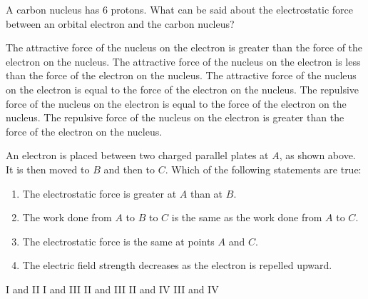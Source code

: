 \documentclass{../../ossphysics}
\begin{document}
\begin{questions}
  \question A carbon nucleus has 6 protons. What can be said about the
  electrostatic force between an orbital electron and the carbon nucleus?
  \begin{choices}
    \choice The attractive force of the nucleus on the electron is greater than
    the force of the electron on the nucleus.
    \choice The attractive force of the nucleus on the electron is less than the
    force of the electron on the nucleus.
    \choice The attractive force of the nucleus on the electron is equal to the
    force of the electron on the nucleus.
    \choice The repulsive force of the nucleus on the electron is equal to the
    force of the electron on the nucleus.
    \choice The repulsive force of the nucleus on the electron is greater than
    the force of the electron on the nucleus.
  \end{choices}
  \newpage
  \question An electron is placed between two charged parallel plates at $A$,
  as shown above. It is then moved to $B$ and then to $C$. Which of the
  following statements are true:
  \begin{enumerate}[nosep,label=\Roman*.]
  \item The electrostatic force is greater at $A$ than at $B$.
  \item The work done from $A$ to $B$ to $C$ is the same as the work done from
    $A$ to $C$.
  \item The electrostatic force is the same at points $A$ and $C$.
  \item The electric field strength decreases as the electron is repelled
    upward.
  \end{enumerate}
  \begin{oneparchoices}
    \choice I and II
    \choice I and III
    \choice II and III
    \choice II and IV
    \choice III and IV
  \end{oneparchoices}



\end{questions}
\end{document}
